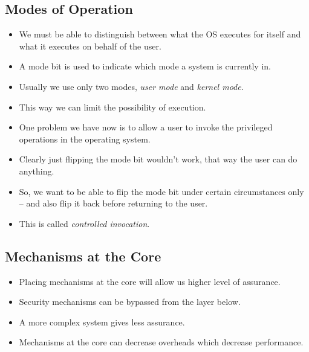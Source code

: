 \subsection{Modes of Operation}

\begin{frame}
  \begin{itemize}
    \item We must be able to distinguish between what the OS executes for 
      itself and what it executes on behalf of the user.

    \item A mode bit is used to indicate which mode a system is currently in.

    \item Usually we use only two modes, \emph{user mode} and \emph{kernel 
      mode}.

    \item This way we can limit the possibility of execution.

  \end{itemize}
\end{frame}

\begin{frame}
  \begin{itemize}
    \item One problem we have now is to allow a user to invoke the privileged 
      operations in the operating system.

    \item Clearly just flipping the mode bit wouldn't work, that way the user 
      can do anything.

    \item So, we want to be able to flip the mode bit under certain 
      circumstances only -- and also flip it back before returning to the user.

    \item This is called \emph{controlled invocation}.
  \end{itemize}
\end{frame}

\subsection{Mechanisms at the Core}

\begin{frame}
  \begin{itemize}
    \item Placing mechanisms at the core will allow us higher level of 
      assurance.

    \item Security mechanisms can be bypassed from the layer below.

    \item A more complex system gives less assurance.

    \item Mechanisms at the core can decrease overheads which decrease 
      performance.
  \end{itemize}
\end{frame}


